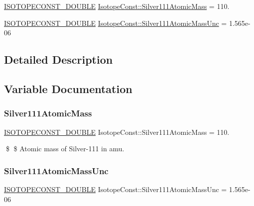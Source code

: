 \begin{DoxyCompactItemize}
\item 
\mbox{\hyperlink{group___isotope_const-_macros_ga8f45a7272ce02c0b4c65c44636ed719a}{I\+S\+O\+T\+O\+P\+E\+C\+O\+N\+S\+T\+\_\+\+D\+O\+U\+B\+LE}} \mbox{\hyperlink{group___isotope_const-_silver-_ag111_ga33325c0ade11c39fdd18e41f75e7341e}{Isotope\+Const\+::\+Silver111\+Atomic\+Mass}} = 110.
\item 
\mbox{\hyperlink{group___isotope_const-_macros_ga8f45a7272ce02c0b4c65c44636ed719a}{I\+S\+O\+T\+O\+P\+E\+C\+O\+N\+S\+T\+\_\+\+D\+O\+U\+B\+LE}} \mbox{\hyperlink{group___isotope_const-_silver-_ag111_ga9f987055bb3ec7b60dbbc065c696e621}{Isotope\+Const\+::\+Silver111\+Atomic\+Mass\+Unc}} = 1.\+565e-\/06
\end{DoxyCompactItemize}


\subsection{Detailed Description}


\subsection{Variable Documentation}
\mbox{\label{group___isotope_const-_silver-_ag111_ga33325c0ade11c39fdd18e41f75e7341e}} 
\subsubsection{\texorpdfstring{Silver111\+Atomic\+Mass}{Silver111AtomicMass}}
{\footnotesize\ttfamily \mbox{\hyperlink{group___isotope_const-_macros_ga8f45a7272ce02c0b4c65c44636ed719a}{I\+S\+O\+T\+O\+P\+E\+C\+O\+N\+S\+T\+\_\+\+D\+O\+U\+B\+LE}} Isotope\+Const\+::\+Silver111\+Atomic\+Mass = 110.}

\$ \$ Atomic mass of Silver-\/111 in amu. \mbox{\label{group___isotope_const-_silver-_ag111_ga9f987055bb3ec7b60dbbc065c696e621}} 
\subsubsection{\texorpdfstring{Silver111\+Atomic\+Mass\+Unc}{Silver111AtomicMassUnc}}
{\footnotesize\ttfamily \mbox{\hyperlink{group___isotope_const-_macros_ga8f45a7272ce02c0b4c65c44636ed719a}{I\+S\+O\+T\+O\+P\+E\+C\+O\+N\+S\+T\+\_\+\+D\+O\+U\+B\+LE}} Isotope\+Const\+::\+Silver111\+Atomic\+Mass\+Unc = 1.\+565e-\/06}


